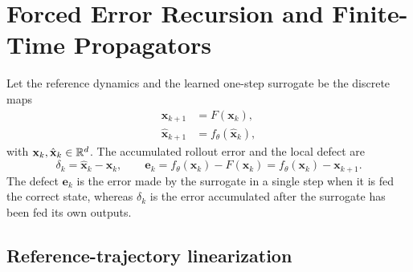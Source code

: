 \section{Forced Error Recursion and Finite-Time Propagators}
\label{sec:formulation}

Let the reference dynamics and the learned one-step surrogate be the discrete maps
\begin{align}
  \mathbf x_{k+1} &= F(\mathbf x_k), \label{eq:true_map}\\
  \hat{\mathbf x}_{k+1} &= f_\theta(\hat{\mathbf x}_k), \label{eq:learned_map}
\end{align}
with $\mathbf x_k,\hat{\mathbf x}_k\in\mathbb{R}^d$. The accumulated rollout error and the local defect are
\begin{equation}
  \delta_k=\hat{\mathbf x}_k-\mathbf x_k,
  \qquad
  \mathbf e_k=f_\theta(\mathbf x_k)-F(\mathbf x_k)=f_\theta(\mathbf x_k)-\mathbf x_{k+1}.
  \label{eq:delta_defect}
\end{equation}
The defect $\mathbf e_k$ is the error made by the surrogate in a single step when it is fed the correct state, whereas $\delta_k$ is the error accumulated after the surrogate has been fed its own outputs.

\subsection{Reference-trajectory linearization}

